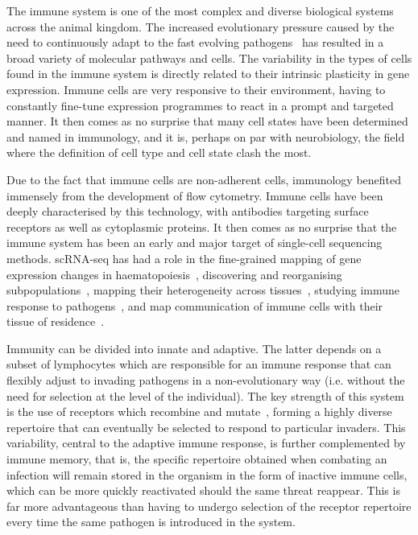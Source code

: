 The immune system is one of the most complex and diverse biological systems across the animal kingdom. The increased evolutionary pressure caused by the need to continuously adapt to the fast evolving pathogens~\citep{barreiro_evolutionary_2010} has resulted in a broad variety of molecular pathways and cells. The variability in the types of cells found in the immune system is directly related to their intrinsic plasticity in gene expression. Immune cells are very responsive to their environment, having to constantly fine-tune expression programmes to react in a prompt and targeted manner. It then comes as no surprise that many cell states have been determined and named in immunology, and it is, perhaps on par with neurobiology, the field where the definition of cell type and cell state clash the most. 

Due to the fact that immune cells are non-adherent cells, immunology benefited immensely from the development of flow cytometry. Immune cells have been deeply characterised by this technology, with antibodies targeting surface receptors as well as cytoplasmic proteins. It then comes as no surprise that the immune system has been an early and major target of single-cell sequencing methods. scRNA-seq has had a role in the fine-grained mapping of gene expression changes in haematopoiesis~\citep{watcham_new_2019}, discovering and reorganising subpopulations~\citep{villani_single-cell_2017}, mapping their heterogeneity across tissues~\citep{miragaia_single-cell_2019,scott_transcription_2018}, studying immune response to pathogens~\citep{lonnberg_single-cell_2017,stubbington_t_2016}, and map communication of immune cells with their tissue of residence~\citep{vento-tormo_single-cell_2018}.

Immunity can be divided into innate and adaptive. The latter depends on a subset of lymphocytes which are responsible for an immune response that can flexibly adjust to invading pathogens in a non-evolutionary way (i.e. without the need for selection at the level of the individual). The key strength of this system is the use of receptors which recombine and mutate~\citep{krangel_mechanics_2009}, forming a highly diverse repertoire that can eventually be selected to respond to particular invaders. This variability, central to the adaptive immune response, is further complemented by immune memory, that is, the specific repertoire obtained when combating an infection will remain stored in the organism in the form of inactive immune cells, which can be more quickly reactivated should the same threat reappear. This is far more advantageous than having to undergo selection of the receptor repertoire every time the same pathogen is introduced in the system.

